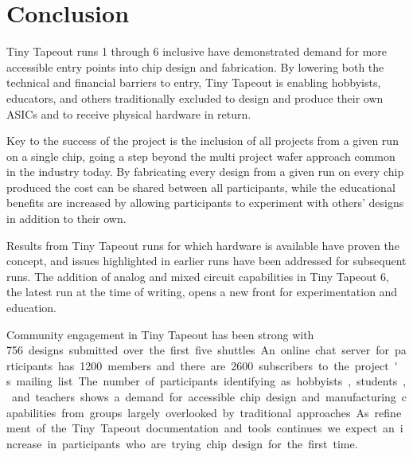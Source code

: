 \section{Conclusion}
\label{sec:conclusion}

Tiny Tapeout runs 1 through 6 inclusive have demonstrated demand for more accessible entry points into chip design and fabrication. By lowering both the technical and financial barriers to entry, Tiny Tapeout is enabling hobbyists, educators, and others traditionally excluded to design and produce their own ASICs and to receive physical hardware in return.

Key to the success of the project is the inclusion of all projects from a given run on a single chip, going a step beyond the multi project wafer approach common in the industry today. By fabricating every design from a given run on every chip produced the cost can be shared between all participants, while the educational benefits are increased by allowing participants to experiment with others' designs in addition to their own.

Results from Tiny Tapeout runs for which hardware is available have proven the concept, and issues highlighted in earlier runs have been addressed for subsequent runs. The addition of analog and mixed circuit capabilities in Tiny Tapeout 6, the latest run at the time of writing, opens a new front for experimentation and education.

Community engagement in Tiny Tapeout has been strong with \qty{756} designs submitted over the first five shuttles. An online chat server for participants has \qty{1200} members and there are \qty{2600} subscribers to the project's mailing list.

The number of participants identifying as hobbyists, students, and teachers shows a demand for accessible chip design and manufacturing capabilities from groups largely overlooked by traditional approaches. As refinement of the Tiny Tapeout documentation and tools continues we expect an increase in participants who are trying chip design for the first time.
